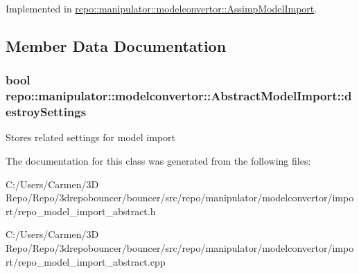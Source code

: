 Implemented in \hyperlink{classrepo_1_1manipulator_1_1modelconvertor_1_1_assimp_model_import_aefdfec79f7be00e1ad452ee22555b64a}{repo\+::manipulator\+::modelconvertor\+::\+Assimp\+Model\+Import}.



\subsection{Member Data Documentation}
\hypertarget{classrepo_1_1manipulator_1_1modelconvertor_1_1_abstract_model_import_a9fd7153ec1348d4836f542f5bd51bfa5}{}
\subsubsection[{destroy\+Settings}]{\setlength{\rightskip}{0pt plus 5cm}bool repo\+::manipulator\+::modelconvertor\+::\+Abstract\+Model\+Import\+::destroy\+Settings\hspace{0.3cm}{\ttfamily [protected]}}\label{classrepo_1_1manipulator_1_1modelconvertor_1_1_abstract_model_import_a9fd7153ec1348d4836f542f5bd51bfa5}
Stores related settings for model import 

The documentation for this class was generated from the following files\+:\begin{DoxyCompactItemize}
\item 
C\+:/\+Users/\+Carmen/3\+D Repo/\+Repo/3drepobouncer/bouncer/src/repo/manipulator/modelconvertor/import/repo\+\_\+model\+\_\+import\+\_\+abstract.\+h\item 
C\+:/\+Users/\+Carmen/3\+D Repo/\+Repo/3drepobouncer/bouncer/src/repo/manipulator/modelconvertor/import/repo\+\_\+model\+\_\+import\+\_\+abstract.\+cpp\end{DoxyCompactItemize}
